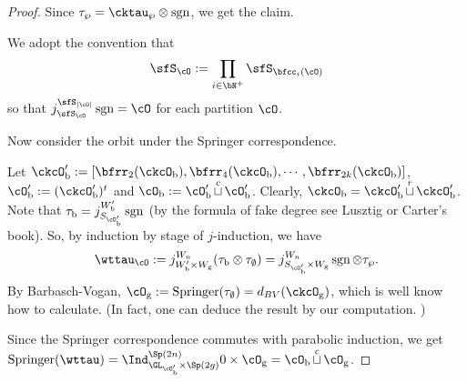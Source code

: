 \documentclass[12pt,a4paper]{amsart}
\def\abs#1{\left|{#1}\right|}
\newcommand{\sgn}{\operatorname{sgn}}
\numberwithin{equation}{section}
\theoremstyle{remark}
\def\half{{\tfrac{1}{2}}}
\def\cuprow{{\stackrel{r}{\sqcup}}}
\def\cupcol{{\stackrel{c}{\sqcup}}}
\def\Spr{\mathrm{Springer}}
\def\cuprow{{\,\stackrel{r}{\sqcup}\,}}
\def\cupcol{{\,\stackrel{c}{\sqcup}\,}}
\begin{document}
\begin{proof}
{{      %

      Since $\tau_{\wp} = \cktau_{\wp}\otimes \sgn$, we get the claim.

      We adopt the convention that
      \[
        \sfS_{\cO} := \prod_{i\in \bN^{+}}\sfS_{\bfcc_{i}(\cO)}
      \]
      so that $j_{\sfS_{\cO}}^{\sfS_{\abs{\cO}}}\sgn = \cO$ for each partition
      $\cO$.

      Now consider the orbit under the Springer correspondence.

      Let
      $\ckcO'_{\mathrm b}: = [\bfrr_{2}(\ckcO_{\mathrm b}), \bfrr_{4}(\ckcO_{\mathrm b}),\cdots, \bfrr_{2k}(\ckcO_{\mathrm b})]$,
      $\cO'_{\mathrm b}:=(\ckcO'_{\mathrm b})^{t}$ and $\cO_{\mathrm b}:=\cO'_{\mathrm b}\cupcol \cO'_{\mathrm b}$.
      Clearly, $\ckcO_{\mathrm b} = \ckcO'_{\mathrm b}\cuprow \ckcO'_{\mathrm b}$. Note that
      $\tau_{\mathrm b} = j_{S_{\cO'_{\mathrm b}}}^{W'_{\mathrm b}} \sgn$ (by the formula of fake degree
      see Lusztig or Carter's book). So, by induction by stage of $j$-induction,
      we have
      \[
        \wttau_{\cO}:= j_{W'_{\mathrm b}\times W_{\mathrm g}}^{W_{n}} (\tau_{\mathrm b}\otimes \tau_{\emptyset}) = j_{S_{\cO'_{\mathrm b}}\times W_{\mathrm g}}^{W_{n}} \sgn\otimes \tau_{\wp}.
      \]
      By Barbasch-Vogan, $\cO_{\mathrm g}:=\Spr(\tau_{\emptyset}) = d_{BV}(\ckcO_{\mathrm g})$,
      which is well know how to calculate. (In fact, one can deduce the result
      by our computation. )

      Since the Springer correspondence commutes with parabolic induction, we
      get
      $\Spr(\wttau) = \Ind_{\GL_{\cO'_{\mathrm b}}\times \Sp(2g)}^{\Sp(2n)} 0\times \cO_{\mathrm g} = \cO_{\mathrm b}\cupcol \cO_{\mathrm g}$.


      \medskip

}}
\end{proof}
\end{document}
